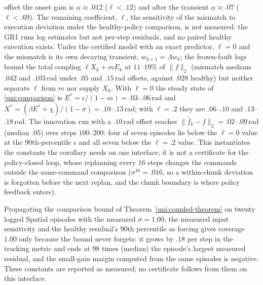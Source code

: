 offset the onset gain is $\underline\alpha\approx.012$ ($\ell<.12$) and after
the transient $\underline\alpha\approx.07$ ($\ell<.69$). The remaining
coefficient, $\ell$, the sensitivity of the mismatch to execution deviation
under the healthy-policy comparison, is not measured: the GR1 runs log
estimates but not per-step residuals, and no paired healthy execution exists.
Under the certified model with an exact predictor, $\ell=0$ and the mismatch is
its own decaying transient, $w_{k+1}=\Lambda w_k$; the frozen-fault logs bound
the total coupling $\ell X_k+m E_k$ at $11$--$19\%$ of $\|f\|_2$ (mismatch
medians $.042$ and $.103$\,rad under $.05$ and $.15$\,rad offsets, against
$.028$ healthy) but neither separate $\ell$ from $m$ nor supply $X_k$. With
$\ell=0$ the steady state of \eqref{uni:comparison} is
$E^\ast=\epsilon/(1-m)=.03$--$.06$\,rad and
$X^\ast=(\beta E^\ast+\chi)/(1-\sigma)=.10$--$.13$\,rad; with $\ell=.2$ they
are $.06$--$.10$ and $.13$--$.18$\,rad. The innovation run with a $.10$\,rad
offset reaches $\|\hat f_k-f\|_2=.02$--$.09$\,rad (median $.05$) over steps
$100$--$200$: four of seven episodes lie below the $\ell=0$ value at the
90th-percentile $\epsilon$ and all seven below the $\ell=.2$ value. This
instantiates the constants the corollary needs on one interface; it is not a
certificate for the policy-closed loop, whose replanning every $16$ steps
changes the commands outside the same-command comparison
($\sigma^{16}=.016$, so a within-chunk deviation is forgotten before the next
replan, and the chunk boundary is where policy feedback enters).

Propagating the comparison bound of Theorem~\ref{uni:coupled-theorem} on
twenty logged Spatial episodes with the measured $\sigma=1.00$, the measured
input sensitivity and the healthy residual's 90th percentile as forcing gives
coverage $1.00$ only because the bound never forgets: it grows by $.18$ per
step in the tracking metric and ends at $98$ times (median) the episode's
largest measured residual, and the small-gain margin computed from the same
episodes is negative. These constants are reported as measured; no certificate
follows from them on this interface.
